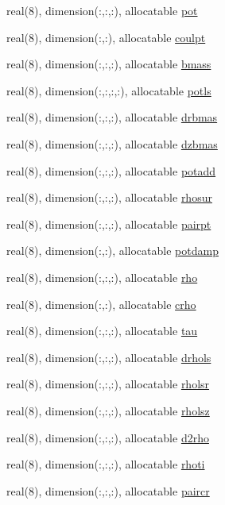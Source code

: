 \begin{DoxyCompactItemize}
\item 
real(8), dimension(\+:,\+:,\+:), allocatable \hyperlink{namespacefields_affeca5502efb412efc5ba78c00db92e5}{pot}
\item 
real(8), dimension(\+:,\+:), allocatable \hyperlink{namespacefields_a96dcbbbbf93ad09f4bab63bb2935ef2b}{coulpt}
\item 
real(8), dimension(\+:,\+:,\+:), allocatable \hyperlink{namespacefields_a3c81f8fd9a140478955f8ffa81ad6e3e}{bmass}
\item 
real(8), dimension(\+:,\+:,\+:,\+:), allocatable \hyperlink{namespacefields_a2e7e890d4b19e3340f4c0bede50db496}{potls}
\item 
real(8), dimension(\+:,\+:,\+:), allocatable \hyperlink{namespacefields_a49978430f369b8966531d037726be271}{drbmas}
\item 
real(8), dimension(\+:,\+:,\+:), allocatable \hyperlink{namespacefields_a08e266194feab00d01074a75a462054a}{dzbmas}
\item 
real(8), dimension(\+:,\+:,\+:), allocatable \hyperlink{namespacefields_a732b1496899b9d685f70149d2111def7}{potadd}
\item 
real(8), dimension(\+:,\+:,\+:), allocatable \hyperlink{namespacefields_a02acfc4f5edd5539212bd53bbb987667}{rhosur}
\item 
real(8), dimension(\+:,\+:,\+:), allocatable \hyperlink{namespacefields_a859b2a3cc162dfed2df581140528e6f7}{pairpt}
\item 
real(8), dimension(\+:,\+:), allocatable \hyperlink{namespacefields_a4d199294340c50de239b3153fc1d8489}{potdamp}
\item 
real(8), dimension(\+:,\+:,\+:), allocatable \hyperlink{namespacefields_a10b593797160d6003356db31c299e2a1}{rho}
\item 
real(8), dimension(\+:,\+:), allocatable \hyperlink{namespacefields_a0b0e5cd1c18125a1a550d87185558179}{crho}
\item 
real(8), dimension(\+:,\+:,\+:), allocatable \hyperlink{namespacefields_a09947e9176ca8b0c02871ba5b3401b12}{tau}
\item 
real(8), dimension(\+:,\+:,\+:), allocatable \hyperlink{namespacefields_a4bb216cb666e2cd3e39493ff2d9edc33}{drhols}
\item 
real(8), dimension(\+:,\+:,\+:), allocatable \hyperlink{namespacefields_ad34c4612788bfa1f20ad97d5182c7614}{rholsr}
\item 
real(8), dimension(\+:,\+:,\+:), allocatable \hyperlink{namespacefields_acd9b81a5e3e3061de1e548b3377edf43}{rholsz}
\item 
real(8), dimension(\+:,\+:,\+:), allocatable \hyperlink{namespacefields_a5369b7cad87a8f7f4a8419064ff98f37}{d2rho}
\item 
real(8), dimension(\+:,\+:,\+:), allocatable \hyperlink{namespacefields_abec1aee0d60d88cce3112a0be3262af7}{rhoti}
\item 
real(8), dimension(\+:,\+:,\+:), allocatable \hyperlink{namespacefields_a7a53b33ec0000c8bbe276697057a6ba2}{paircr}
\end{DoxyCompactItemize}



